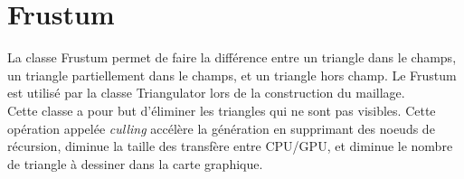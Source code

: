   \section{Frustum}
  La classe Frustum permet de faire la différence entre un triangle dans le champs, un triangle partiellement dans le champs, et un triangle hors champ. Le Frustum est utilisé par la classe Triangulator lors de la construction du maillage.\\
  
  Cette classe a pour but d'éliminer les triangles qui ne sont pas visibles. Cette opération appelée \textit{culling} accélère la génération en supprimant des noeuds de récursion, diminue la taille des transfère entre CPU/GPU, et diminue le nombre de triangle à dessiner dans la carte graphique.
  
  
 \newpage %
 